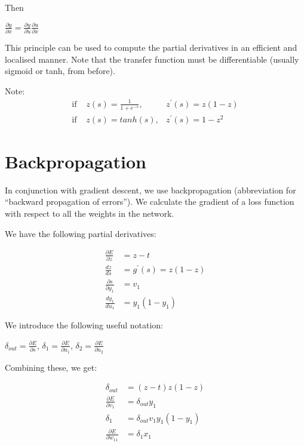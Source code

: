 Then

{\centering
    $\frac{\partial y}{\partial x} = \frac{\partial y}{\partial u} \frac{\partial u}{\partial x}$

}

This principle can be used to compute the partial derivatives in an efficient
and localised manner. Note that the transfer function must be differentiable
(usually sigmoid or tanh, from before).

Note:
\begin{align*}
    \text{if } & z(s) = \frac{1}{1 + e^{-s}}, & z^{\prime}(s) = z(1 - z)\\
    \text{if } & z(s) = tanh(s),              & z^{\prime}(s) = 1 - z^2
\end{align*}

\section{Backpropagation}
In conjunction with gradient descent, we use backpropagation (abbreviation for
``backward propagation of errors''). We calculate the gradient of a loss
function with respect to all the weights in the network.

We have the following partial derivatives:

\begin{align*}
    \frac{\partial E}{\partial z} &= z - t\\
    \frac{dz}{ds} &= g^{\prime}(s) = z(1 - z)\\
    \frac{\partial s}{\partial y_1} &= v_1\\
    \frac{dy_1}{du_1} &= y_1(1-y_1)
\end{align*}

We introduce the following useful notation:

{\centering
    $\delta_{out} = \frac{\partial E}{\partial s}$, $\delta_1 = \frac{\partial
    E}{\partial u_1}$, $\delta_2 = \frac{\partial E}{\partial u_2}$

}

Combining these, we get:

\begin{align*}
    \delta_{out} &= (z - t)z(1 - z)\\
    \frac{\partial E}{\partial v_1} &= \delta_{out}y_1\\
    \delta_1 &= \delta_{out}v_1y_1(1-y_1)\\
    \frac{\partial E}{\partial w_{11}} &= \delta_1x_1
\end{align*}

